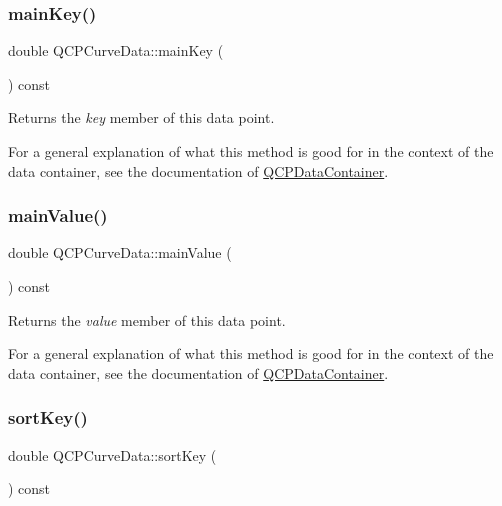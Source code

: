 \subsubsection{\texorpdfstring{main\+Key()}{mainKey()}}
{\footnotesize\ttfamily double Q\+C\+P\+Curve\+Data\+::main\+Key (\begin{DoxyParamCaption}{ }\end{DoxyParamCaption}) const\hspace{0.3cm}{\ttfamily [inline]}}

Returns the {\itshape key} member of this data point.

For a general explanation of what this method is good for in the context of the data container, see the documentation of \hyperlink{class_q_c_p_data_container}{Q\+C\+P\+Data\+Container}. \mbox{\label{class_q_c_p_curve_data_a39a94131e5f62f16b256bcf8c47a3205}} 
\subsubsection{\texorpdfstring{main\+Value()}{mainValue()}}
{\footnotesize\ttfamily double Q\+C\+P\+Curve\+Data\+::main\+Value (\begin{DoxyParamCaption}{ }\end{DoxyParamCaption}) const\hspace{0.3cm}{\ttfamily [inline]}}

Returns the {\itshape value} member of this data point.

For a general explanation of what this method is good for in the context of the data container, see the documentation of \hyperlink{class_q_c_p_data_container}{Q\+C\+P\+Data\+Container}. \mbox{\label{class_q_c_p_curve_data_a583174f2b68e01b4d545f04571f58bd0}} 
\subsubsection{\texorpdfstring{sort\+Key()}{sortKey()}}
{\footnotesize\ttfamily double Q\+C\+P\+Curve\+Data\+::sort\+Key (\begin{DoxyParamCaption}{ }\end{DoxyParamCaption}) const\hspace{0.3cm}{\ttfamily [inline]}}

